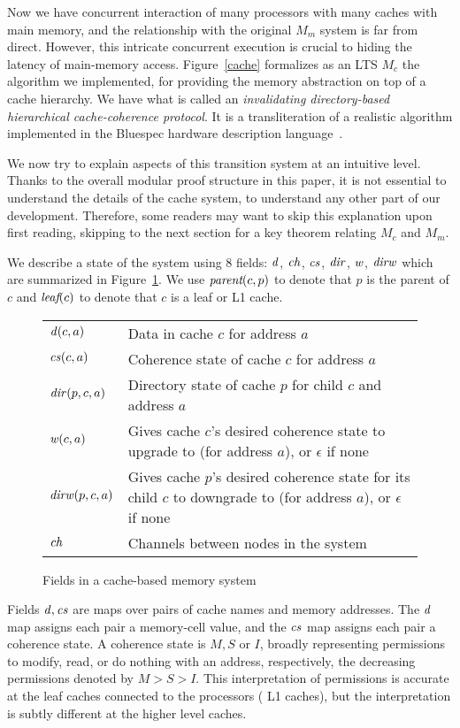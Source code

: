 Now we have concurrent interaction of many processors with many caches
with main memory, and the relationship with the original $M_m$ system
is far from direct.  However, this intricate concurrent execution is
crucial to hiding the latency of main-memory access.
Figure~\ref{cache} formalizes as an LTS $M_c$ the algorithm we implemented,
for providing the memory abstraction on top of a cache hierarchy.
We have what is called an \emph{invalidating directory-based hierarchical
cache-coherence protocol}.  It is a transliteration of a realistic
algorithm implemented in the Bluespec hardware description
language~\cite{Bluespec:TFRG}. 

We now try to explain aspects of this transition system at an
intuitive level.  Thanks to the overall modular proof structure in
this paper, it is not essential to understand the details of the cache
system, to understand any other part of our development.  Therefore,
some readers may want to skip this explanation upon first reading,
skipping to the next section for a key theorem relating $M_c$ and $M_m$.

We describe a state of the system using 8 fields: $\mathit{d}$, $\mathit{ch}$, $\mathit{cs}$, $\mathit{dir}$,
$\mathit{w}$, $\mathit{dirw}$ which are summarized in Figure~\ref{fields}.
We use $\textit{parent}(c,p)$ to denote that $p$ is the parent of $c$ and $\textit{leaf}(c)$ to 
denote that $c$ is a leaf or L1 cache.

\begin{figure}
\centering
\begin{tabular}{|l|p{5.5cm}|}
\hline
$\mathit{d}(c,a)$ & Data in cache $c$ for address $a$\\
$\mathit{cs}(c,a)$ & Coherence state of cache $c$ for address $a$\\
$\mathit{dir}(p,c,a)$ & Directory state of cache $p$ for child $c$ and address $a$\\
$\mathit{w}(c,a)$ & Gives cache $c$'s desired coherence state to upgrade to (for address $a$), or $\epsilon$ if none\\
$\mathit{dirw}(p,c,a)$ & Gives cache $p$'s desired coherence state for its child $c$ to downgrade to (for address $a$), or $\epsilon$ if none\\
$\mathit{ch}$ & Channels between nodes in the system\\
\hline
\end{tabular}
\caption{Fields in a cache-based memory system}
\label{fields}
\end{figure}

Fields $\mathit{d}, \mathit{cs}$ are maps over pairs of cache names and memory addresses.
The $\mathit{d}$ map assigns each pair a memory-cell value, and the $\mathit{cs}$ map
assigns each pair a coherence state.  A coherence state is $M, S$ or
$I$, broadly representing permissions to modify, read, or do nothing
with an address, respectively, the decreasing permissions denoted by $M > S > I$. This interpretation of permissions is
accurate at the leaf caches connected to the processors (\ie{} L1 caches),
but the interpretation is subtly different at the higher level caches.

